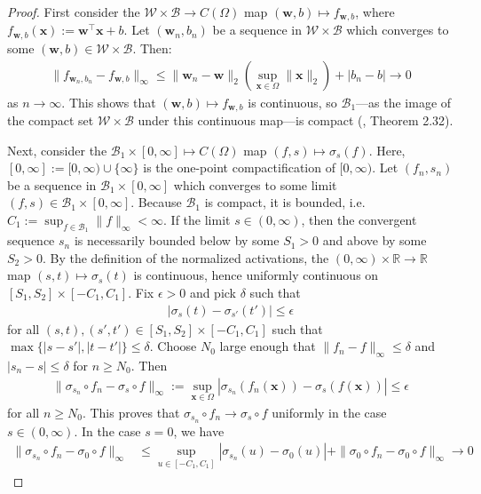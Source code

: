 \documentclass{article}
\def\vw{{\bm{w}}}
\def\vx{{\bm{x}}}
\def\cB{{\mathcal{B}}}
\def\cW{{\mathcal{W}}}
\newcommand{\R}{\mathbb{R}}
\begin{document}
\begin{appendices}
\begin{proof}
    First consider the $\cW \times \cB \to C(\Omega)$ map $(\vw,b) \mapsto f_{\vw, b}$, where $f_{\vw,b}(\vx) := \vw^\top \vx + b$. Let $(\vw_n, b_n)$ be a sequence in $\cW \times \cB$ which converges to some $(\vw, b) \in \cW \times \cB$. Then:
\begin{align}
    \| f_{\vw_n, b_n} - f_{\vw,b} \|_\infty \leq \| \vw_n - \vw \|_2 \left( \sup_{\vx \in \Omega} \| \vx \|_2 \right) + |b_n - b| \to 0
\end{align}
as $n \to \infty$. This shows that $(\vw,b) \mapsto f_{\vw,b}$ is continuous, so $\cB_1$---as the image of the compact set $\cW \times \cB$ under this continuous map---is compact (\cite{aliprantis2006infinite}, Theorem 2.32).

Next, consider the $\cB_1 \times [0,\infty] \mapsto C(\Omega)$ map $(f,s) \mapsto \sigma_s(f)$. Here, $[0,\infty] := [0,\infty) \cup \{ \infty \}$ is the one-point compactification of $[0,\infty)$. Let $(f_n, s_n)$ be a sequence in $\cB_1 \times [0,\infty]$ which converges to some limit $(f,s) \in \cB_1 \times [0,\infty]$. Because $\cB_1$ is compact, it is bounded, i.e. $C_1 := \sup_{f \in \cB_1} \| f \|_\infty < \infty$. If the limit $s \in (0,\infty)$, then the convergent sequence $s_n$ is necessarily bounded below by some $S_1 > 0$ and above by some $S_2 > 0$. By the definition of the normalized activations, the $(0,\infty) \times \R \to \R$ map $(s,t) \mapsto \sigma_s(t)$ is continuous, hence uniformly continuous on $[S_1,S_2] \times [-C_1,C_1]$. Fix $\epsilon > 0$ and pick $\delta$ such that
\begin{align}
    \left| \sigma_s(t) - \sigma_{s'}(t') \right| \leq \epsilon
\end{align}
for all $(s,t), (s',t') \in [S_1, S_2] \times [-C_1, C_1]$ such that $\max\{ |s-s'|, |t-t'| \} \leq \delta$. Choose $N_0$ large enough that $\| f_n - f \|_\infty \leq \delta$ and $|s_n - s| \leq \delta$ for $n \geq N_0$. Then
\begin{align}
   \| \sigma_{s_n} \circ f_n - \sigma_s \circ f \|_\infty :=  \sup_{\vx \in \Omega} \left| \sigma_{s_n}(f_n(\vx)) - \sigma_s(f(\vx)) \right| \leq \epsilon
\end{align}
for all $n \geq N_0$. This proves that $\sigma_{s_n} \circ f_n \to \sigma_s \circ f$ uniformly in the case $s \in (0,\infty)$. In the case $s = 0$, we have
\begin{align}
   \| \sigma_{s_n} \circ f_n - \sigma_0 \circ f \|_\infty &\leq \sup_{u \in [-C_1, C_1]} \left| \sigma_{s_n}(u) - \sigma_0(u) \right| + \| \sigma_0 \circ f_n - \sigma_0 \circ f \|_\infty \to 0

\end{align}
\end{proof}
\end{appendices}
\end{document}
